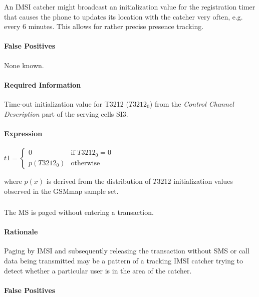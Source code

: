 \documentclass[a4paper,11pt,notitlepage,bigheadings,oneside]{scrartcl}
\begin{document}
An IMSI catcher might broadcast an initialization value for the registration
timer that causes the phone to updates its location with the catcher very
often, e.g. every 6 minutes. This allows for rather precise presence tracking.

\paragraph{False Positives}

None known.

\paragraph{Required Information}

Time-out initialization value for T3212 ($T3212_0$) from the \emph{Control
Channel Description} part of the serving cells SI3.

\paragraph{Expression}

$t1 =
\begin{cases}
	0 	 	& \text{if } T3212_0 = 0 \\
	p(T3212_0) 	& \text{otherwise}
\end{cases}$

where $p(x)$ is derived from the distribution of $T3212$ initialization values
observed in the GSMmap sample set.


\subsubsection{}

The MS is paged without entering a transaction.

\paragraph{Rationale}

Paging by IMSI and subsequently releasing the transaction without SMS or call
data being transmitted may be a pattern of a tracking IMSI catcher trying to
detect whether a particular user is in the area of the catcher.

\paragraph{False Positives}
\end{document}
